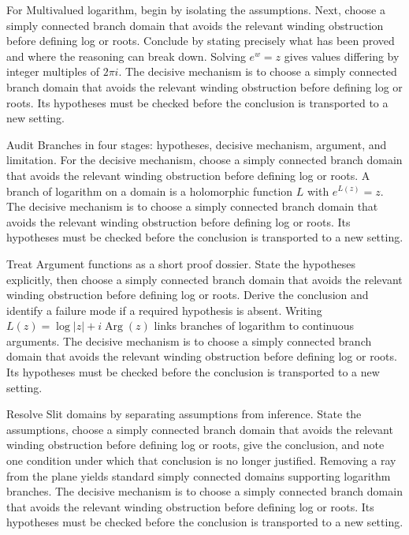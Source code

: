 \begin{example}\label{ex:iv14-worked-01}
For Multivalued logarithm, begin by isolating the assumptions. Next, choose a simply connected branch domain that avoids the relevant winding obstruction before defining log or roots. Conclude by stating precisely what has been proved and where the reasoning can break down. Solving $e^w=z$ gives values differing by integer multiples of $2\pi i$. The decisive mechanism is to choose a simply connected branch domain that avoids the relevant winding obstruction before defining log or roots. Its hypotheses must be checked before the conclusion is transported to a new setting.
\end{example}

\begin{example}\label{ex:iv14-worked-02}
Audit Branches in four stages: hypotheses, decisive mechanism, argument, and limitation. For the decisive mechanism, choose a simply connected branch domain that avoids the relevant winding obstruction before defining log or roots. A branch of logarithm on a domain is a holomorphic function $L$ with $e^{L(z)}=z$. The decisive mechanism is to choose a simply connected branch domain that avoids the relevant winding obstruction before defining log or roots. Its hypotheses must be checked before the conclusion is transported to a new setting.
\end{example}

\begin{example}\label{ex:iv14-worked-03}
Treat Argument functions as a short proof dossier. State the hypotheses explicitly, then choose a simply connected branch domain that avoids the relevant winding obstruction before defining log or roots. Derive the conclusion and identify a failure mode if a required hypothesis is absent. Writing $L(z)=\log|z|+i\operatorname{Arg}(z)$ links branches of logarithm to continuous arguments. The decisive mechanism is to choose a simply connected branch domain that avoids the relevant winding obstruction before defining log or roots. Its hypotheses must be checked before the conclusion is transported to a new setting.
\end{example}

\begin{example}\label{ex:iv14-worked-04}
Resolve Slit domains by separating assumptions from inference. State the assumptions, choose a simply connected branch domain that avoids the relevant winding obstruction before defining log or roots, give the conclusion, and note one condition under which that conclusion is no longer justified. Removing a ray from the plane yields standard simply connected domains supporting logarithm branches. The decisive mechanism is to choose a simply connected branch domain that avoids the relevant winding obstruction before defining log or roots. Its hypotheses must be checked before the conclusion is transported to a new setting.
\end{example}


